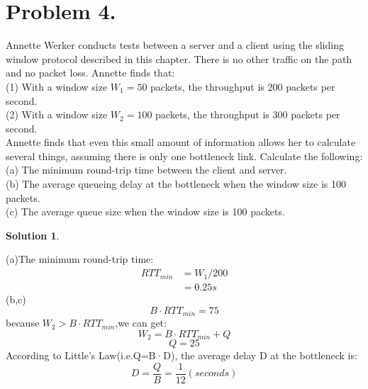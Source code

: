 \documentclass[UTF8,oneside]{article}
\newtheorem*{Solution}{Solution}
\begin{document}
\section*{Problem 4.}
Annette Werker conducts tests between a server and a client using the sliding window protocol described in this chapter. There is no other traffic on the path and no packet loss. Annette finds that:\\
(1) With a window size $W_{1}=50$ packets, the throughput is 200 packets per second.\\
(2) With a window size $W_{2}=100$ packets, the throughput is 300 packets per second.\\
Annette finds that even this small amount of information allows her to calculate several things, assuming there is only one bottleneck link. Calculate the following:\\
(a) The minimum round-trip time between the client and server.\\
(b) The average queueing delay at the bottleneck when the window size is 100 packets.\\
(c) The average queue size when the window size is 100 packets.
\begin{Solution}
\end{Solution}
(a)The minimum round-trip time:
\begin{align*}
RTT_{min}&=W_1/200\\
&=0.25s
\end{align*}
(b,c)$$B·RTT_{min}=75$$
because $W_2>B·RTT_{min}$,we can get:$$W_2=B·RTT_{min}+Q$$ $$Q=25$$
According to Little's Law(i.e.Q=B·D), the average delay D at the bottleneck is:$$D=\frac{Q}{B}=\frac{1}{12}(seconds)$$

\end{document}
